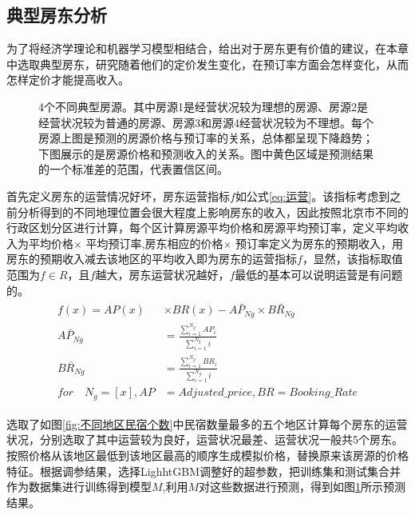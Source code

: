 \documentclass{article}
\begin{document}
\begin{multicols}{2}
\section{典型房东分析}
为了将经济学理论和机器学习模型相结合，给出对于房东更有价值的建议，在本章中选取典型房东，研究随着他们的定价发生变化，在预订率方面会怎样变化，从而怎样定价才能提高收入。
\begin{figure}[!htbp]
	\centering
	\caption{4个不同典型房源。其中房源1是经营状况较为理想的房源、房源2是经营状况较为普通的房源、房源3和房源4经营状况较为不理想。每个房源上图是预测的房源价格与预订率的关系，总体都呈现下降趋势；下图展示的是房源价格和预测收入的关系。图中黄色区域是预测结果的一个标准差的范围，代表置信区间。}
	\label{fig:典型房源}
\end{figure}
\par 首先定义房东的运营情况好坏，房东运营指标$f$如公式\ref{eq:运营}。该指标考虑到之前分析得到的不同地理位置会很大程度上影响房东的收入，因此按照北京市不同的行政区划分区进行计算，每个区计算房源平均价格和房源平均预订率，定义平均收入为平均价格$\times$ 平均预订率,房东相应的价格$\times$ 预订率定义为房东的预期收入，用房东的预期收入减去该地区的平均收入即为房东的运营指标$f$，显然，该指标取值范围为$f \in R$，且$f$越大，房东运营状况越好，$f$最低的基本可以说明运营是有问题的。
\begin{align}\label{eq:运营}
	\begin{split}
		f(x)=AP(x)&\times BR(x) -\bar{AP_{Ng}}\times \bar{BR_{Ng}}\\ \bar{AP_{Ng}}&=\frac{\sum_{i=1}^{N_g}AP_{i}}{\sum_{i=1}^{N_g}i}\\
		\bar{BR_{Ng}}&=\frac{\sum_{i=1}^{N_g}BR_{i}}{\sum_{i=1}^{N_g}i}\\
		for \quad N_g=\left[x\right],AP&=Adjusted\_price,BR=Booking\_Rate
	\end{split}
\end{align}
\par 选取了如图\ref{fig:不同地区民宿个数}中民宿数量最多的五个地区计算每个房东的运营状况，分别选取了其中运营较为良好，运营状况最差、运营状况一般共5个房东。按照价格从该地区最低到该地区最高的顺序生成模拟价格，替换原来该房源的价格特征。根据调参结果，选择LighhtGBM调整好的超参数，把训练集和测试集合并作为数据集进行训练得到模型$M$,利用$M$对这些数据进行预测，得到如图\ref{fig:典型房源}所示预测结果。


\end{multicols}
\end{document}
